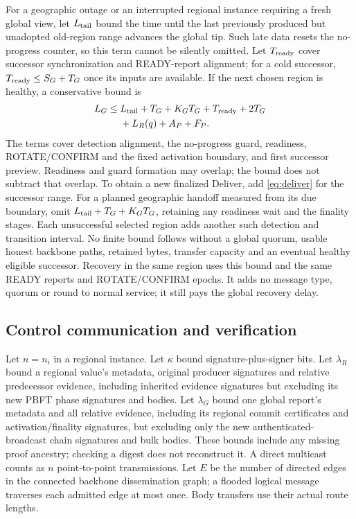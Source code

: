 \documentclass[11pt,a4paper,onecolumn]{article}
\theoremstyle{remark}\newtheorem{example}[definition]{Example}
\begin{document}
For a geographic outage or an interrupted regional instance requiring a fresh
global view, let $L_{\rm tail}$ bound the time until the last
previously produced but unadopted old-region range advances the global tip.
Such late data resets the no-progress counter, so this term cannot be silently
omitted. Let $T_{\rm ready}$ cover successor synchronization and READY-report
alignment; for a cold successor, $T_{\rm ready}\leq S_G+T_G$ once its inputs are
available. If the next chosen region is healthy, a conservative bound is
\begin{equation}\label{eq:georecover}
\begin{split}
 L_G\leq{}&L_{\rm tail}+T_G+K_GT_G+T_{\rm ready}+2T_G\\
          &{}+L_R(q)+A_P+F_P.
\end{split}
\end{equation}
The terms cover detection alignment, the no-progress guard, readiness,
ROTATE/CONFIRM and the fixed activation boundary, and first successor preview.
Readiness and guard formation may overlap; the bound does not subtract that
overlap. To obtain a new finalized Deliver, add \eqref{eq:deliver} for the
successor range. For a planned geographic handoff measured from its due boundary,
omit $L_{\rm tail}+T_G+K_GT_G$, retaining any readiness wait and the finality
stages. Each unsuccessful selected region adds another such detection and
transition interval. No finite bound follows without a global quorum, usable
honest backbone paths, retained bytes, transfer capacity and an eventual healthy
eligible successor. Recovery in the same region uses this bound and the same
READY reports and ROTATE/CONFIRM epochs. It adds no message type, quorum or
round to normal service; it still pays the global recovery delay.


\subsection{Control communication and verification}\label{sec:controlcost}
Let $n=n_i$ in a regional instance. Let $\kappa$ bound signature-plus-signer
bits. Let $\lambda_R$ bound a regional value's metadata, original producer signatures
and relative predecessor evidence, including inherited evidence signatures but
excluding its new PBFT phase signatures and bodies. Let $\lambda_G$ bound one global
report's metadata and all relative evidence, including its regional commit
certificates and activation/finality signatures, but excluding only the new
authenticated-broadcast chain signatures and bulk bodies. These bounds include any missing proof ancestry;
checking a digest does not reconstruct it. A direct multicast counts as $n$
point-to-point transmissions. Let $E$ be the number of directed edges in the
connected backbone dissemination graph; a flooded logical message traverses
each admitted edge at most once. Body transfers use their actual route lengths.
\end{document}
